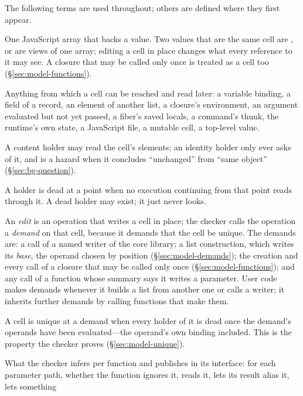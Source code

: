 The following terms are used throughout; others are defined where they first appear.

\begin{description}[leftmargin=1.2em,font=\normalfont\bfseries]
\item[Cell.] One JavaScript array that backs a  value. Two  values that are the
same cell are \code{===}, or are views of one array; editing a cell in place changes what every
reference to it may see. A closure that may be called only once is treated as a cell too
(\S\ref{sec:model-functions}).
\item[Holder.] Anything from which a cell can be reached and read later: a variable binding, a field
of a record, an element of another list, a closure's environment, an argument evaluated but not yet
passed, a fiber's saved locals, a command's thunk, the runtime's own state, a JavaScript file, a
mutable cell, a top-level value.
\item[Content holder, identity holder.] A content holder may read the cell's elements; an identity
holder only ever asks  of it, and is a hazard when it concludes ``unchanged'' from
``same object'' (\S\ref{sec:bg-question}).
\item[Dead.] A holder is dead at a point when no execution continuing from that point reads through
it. A dead holder may exist; it just never looks.
\item[Edit, demand, base.] An \emph{edit} is an operation that writes a cell in place; the checker
calls the operation a \emph{demand} on that cell, because it demands that the cell be unique. The
demands are: a call of a named writer of the core library; a list construction, which writes its
\emph{base}, the operand chosen by position (\S\ref{sec:model-demands}); the creation and every call of
a closure that may be called only once (\S\ref{sec:model-functions}); and any call of a function whose
summary says it writes a parameter. User code makes demands whenever it builds a list from another one
or calls a writer; it inherits further demands by calling functions that make them.
\item[Unique at a site.] A cell is unique at a demand when every holder of it is dead once the
demand's operands have been evaluated---the operand's own binding included. This is the property the
checker proves (\S\ref{sec:model-unique}).
\item[Summary.] What the checker infers per function and publishes in its interface: for each
parameter path, whether the function ignores it, reads it, lets its result alias it, lets something

\end{description}
